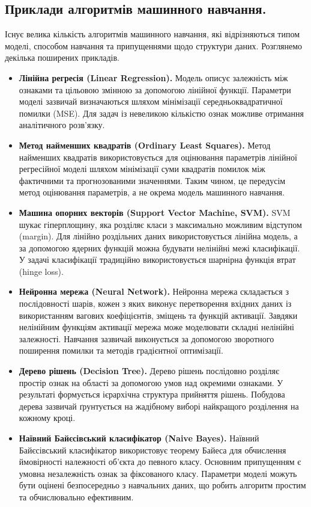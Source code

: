 \subsection{Приклади алгоритмів машинного навчання.}

Існує велика кількість алгоритмів машинного навчання, які відрізняються
типом моделі, способом навчання та припущеннями щодо структури даних.
Розглянемо декілька поширених прикладів.


\begin{itemize}

\item \textbf{Лінійна регресія (Linear Regression).}
Модель описує залежність між ознаками та цільовою змінною за допомогою
лінійної функції. Параметри моделі зазвичай визначаються шляхом мінімізації
середньоквадратичної помилки (MSE). Для задач із невеликою кількістю ознак
можливе отримання аналітичного розв'язку.

\item \textbf{Метод найменших квадратів (Ordinary Least Squares).}
Метод найменших квадратів використовується для оцінювання параметрів
лінійної регресійної моделі шляхом мінімізації суми квадратів помилок між
фактичними та прогнозованими значеннями. Таким чином, це передусім метод
оцінювання параметрів, а не окрема модель машинного навчання.

\item \textbf{Машина опорних векторів (Support Vector Machine, SVM).}
SVM шукає гіперплощину, яка розділяє класи з максимально можливим
відступом (margin). Для лінійно роздільних даних використовується лінійна
модель, а за допомогою ядерних функцій можна будувати нелінійні межі
класифікації. У задачі класифікації традиційно використовується
шарнірна функція втрат (hinge loss).

\item \textbf{Нейронна мережа (Neural Network).}
Нейронна мережа складається з послідовності шарів, кожен з яких виконує
перетворення вхідних даних із використанням вагових коефіцієнтів,
зміщень та функцій активації. Завдяки нелінійним функціям активації мережа
може моделювати складні нелінійні залежності. Навчання зазвичай виконується
за допомогою зворотного поширення помилки та методів градієнтної
оптимізації.

\item \textbf{Дерево рішень (Decision Tree).}
Дерево рішень послідовно розділяє простір ознак на області за допомогою
умов над окремими ознаками. У результаті формується ієрархічна структура
прийняття рішень. Побудова дерева зазвичай ґрунтується на жадібному виборі
найкращого розділення на кожному кроці.

\item \textbf{Наївний Байєсівський класифікатор (Naive Bayes).}
Наївний Байєсівський класифікатор використовує теорему Байеса для
обчислення ймовірності належності об'єкта до певного класу. Основним
припущенням є умовна незалежність ознак за фіксованого класу. Параметри
моделі можуть бути оцінені безпосередньо з навчальних даних, що робить
алгоритм простим та обчислювально ефективним.

\end{itemize}



